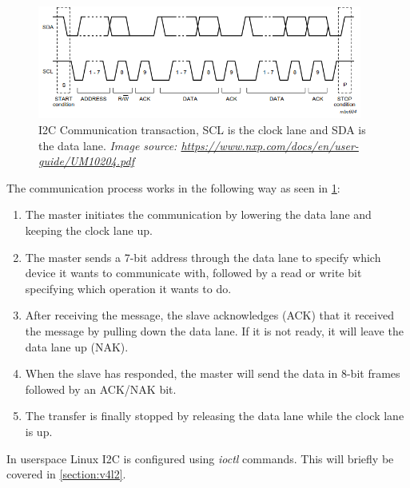 \begin{figure}
    \begin{center}
        \includegraphics[width=0.95\textwidth]{figures/I2C_transaction.png}
    \end{center}
    \caption{I2C Communication transaction, SCL is the clock lane and SDA is the data lane.
        \textit{Image source: \href{https://www.nxp.com/docs/en/user-guide/UM10204.pdf}{https://www.nxp.com/docs/en/user-guide/UM10204.pdf}}}\label{fig:I2C}
\end{figure}

The communication process works in the following way as seen in \cref{fig:I2C}:

\begin{enumerate}
    \item The master initiates the communication by lowering the data lane and
        keeping the clock lane up.

    \item The master sends a 7-bit address through the data lane to specify
        which device it wants to communicate with, followed by a read or write
        bit specifying which operation it wants to do.

    \item After receiving the message, the slave acknowledges (ACK) that it received
        the message by pulling down the data lane. If it is not ready, it will
        leave the data lane up (NAK).

    \item When the slave has responded, the master will send the data in 8-bit
        frames followed by an ACK/NAK bit.

    \item The transfer is finally stopped by releasing the data lane while the
        clock lane is up.
\end{enumerate}

In userspace Linux I2C is configured using \textit{ioctl} commands. This will
briefly be covered in \cref{section:v4l2}.

